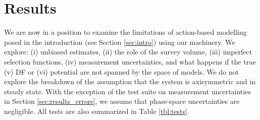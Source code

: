 \section{Results} \label{sec:results}

We are now in a position to examine the limitations of action-based modelling posed in the introduction (see Section \ref{sec:intro}) using our \RM{} machinery. We explore: (i) unbiased estimates, (ii) the role of the survey volume, (iii) imperfect selection functions, (iv) measurement uncertainties, and what happens if the true (v) DF or (vi) potential are not spanned by the space of models. We do not explore the breakdown of the assumption that the system is axisymmetric and
in steady state. With the exception of the test suite on measurement uncertainties in Section \ref{sec:results_errors}, we assume that phase-space uncertainties are negligible. All tests are also summarized in Table \ref{tbl:tests}. 

